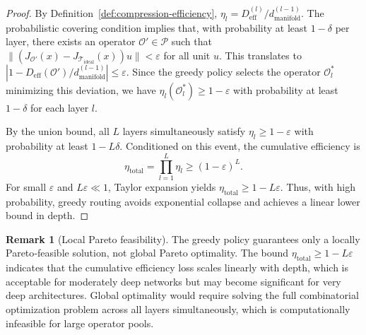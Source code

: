 \documentclass[11pt, a4paper]{article}
\theoremstyle{definition}
\newtheorem{remark}{Remark}[section]
\begin{document}
\begin{proof}
By Definition~\ref{def:compression-efficiency}, $\eta_l = D_{\text{eff}}^{(l)} / d_{\text{manifold}}^{(l-1)}$. The probabilistic covering condition implies that, with probability at least $1-\delta$ per layer, there exists an operator $\mathcal{O}' \in \mathcal{P}$ such that $\| (J_{\mathcal{O}'}(x) - J_{\mathcal{T}_{\text{ideal}}}(x)) u \| < \varepsilon$ for all unit $u$. This translates to $|1 - D_{\text{eff}}(\mathcal{O}')/d_{\text{manifold}}^{(l-1)}| \le \varepsilon$. Since the greedy policy selects the operator $\mathcal{O}_l^*$ minimizing this deviation, we have $\eta_l(\mathcal{O}_l^*) \ge 1 - \varepsilon$ with probability at least $1-\delta$ for each layer $l$.

By the union bound, all $L$ layers simultaneously satisfy $\eta_l \ge 1 - \varepsilon$ with probability at least $1 - L\delta$. Conditioned on this event, the cumulative efficiency is
\begin{equation}
\eta_{\text{total}} = \prod_{l=1}^L \eta_l \ge (1 - \varepsilon)^L.
\end{equation}
For small $\varepsilon$ and $L\varepsilon \ll 1$, Taylor expansion yields $\eta_{\text{total}} \ge 1 - L\varepsilon$.
Thus, with high probability, greedy routing avoids exponential collapse and achieves a linear lower bound in depth.
\end{proof}

\begin{remark}[Local Pareto feasibility]
The greedy policy guarantees only a locally Pareto‑feasible solution, not global Pareto optimality. The bound $\eta_{\text{total}} \ge 1 - L\varepsilon$ indicates that the cumulative efficiency loss scales linearly with depth, which is acceptable for moderately deep networks but may become significant for very deep architectures. Global optimality would require solving the full combinatorial optimization problem across all layers simultaneously, which is computationally infeasible for large operator pools.
\end{remark}
\end{document}
